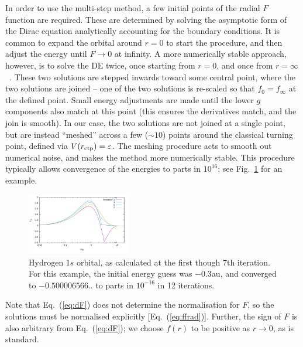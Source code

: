 \documentclass[10pt,twocolumn,a4paper]{article}%
\def\en{\ensuremath{\varepsilon}}
\begin{document}
In order to use the multi-step method, a few initial points of the radial $F$ function are required.
These are determined by solving the asymptotic form of the Dirac equation analytically accounting for the boundary conditions.
It is common to expand the orbital around $r=0$ to start the procedure, and then adjust the energy until $F\to0$ at infinity.
%
A more numerically stable approach, however, is to solve the DE twice, once starting from $r=0$, and once from $r=\infty$~\cite{JohnsonBook2007}.
These two solutions are stepped inwards toward some central point, where the two solutions are joined -- one of the two solutions is re-scaled so that $f_0=f_\infty$ at the defined point.
Small energy adjustments are made until the lower $g$ components also match at this point (this ensures the derivatives match, and the join is smooth).
In our case, the two solutions are not joined at a single point, but are instead ``meshed'' across a few ($\sim10$)  points around the classical turning point, defined via $V(r_{\rm ctp}) = \en$.
The meshing procedure acts to smooth out numerical noise, and makes the method more numerically stable.
This procedure typically allows convergence of the energies to parts in $10^{16}$;
see Fig.~\ref{fig:H-SolveBS} for an example.


\begin{figure}
\centering
\includegraphics[width=0.4\textwidth]{img/H-SolveBS}
\caption{\small Hydrogen $1s$ orbital, as calculated at the first though 7th iteration.
For this example, the initial energy guess was $-0.3$au, and converged to $-0.500006566..$ to parts in $10^{-16}$ in 12 iterations.\label{fig:H-SolveBS}}
\end{figure}





Note that Eq.~(\ref{eq:dF}) does not determine the normalisation for $F$, so the solutions must be normalised explicitly [Eq.~(\ref{eq:ffrad})].
Further, the sign of $F$ is also arbitrary from Eq.~(\ref{eq:dF}); we choose $f(r)$ to be positive as $r\to 0$, as is standard.
\end{document}
